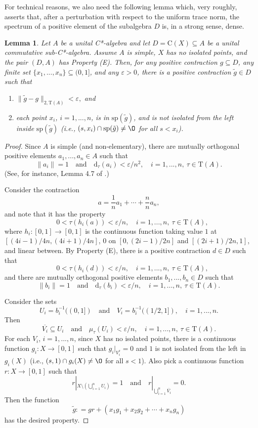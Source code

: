 \documentclass[12pt, oneside, psamsfonts]{amsart}
\newtheorem{lem}[thm]{Lemma}
\theoremstyle{definition}
\theoremstyle{remark}
\numberwithin{equation}{section}
\newcommand{\norm}[1]{\| #1\|}
\newcommand{\eps}{\varepsilon}
\newcommand{\tr}{\mathrm{T}}
\begin{document}
For technical reasons, we also need the following lemma which, very roughly, asserts that, after a perturbation with respect to the uniform trace norm, the spectrum of a positive element of the subalgebra $D$ is, in a strong sense, dense.
\begin{lem}\label{dense-sp-pert}
Let $A$ be a unital C*-algebra and let $D = \mathrm{C}(X) \subseteq A$ be a unital commutative sub-C*-algebra. Assume $A$ is simple, $X$ has no isolated points, and the pair $(D, A)$ has Property (E). Then, for any positive contraction $g \subseteq D$, any finite set $\{x_1, ..., x_n\} \subseteq (0, 1]$, and any $\eps>0$, there is a positive contraction $\tilde{g} \in D$ such that 
\begin{enumerate}
\item $\norm{\tilde{g} - g}_{2, \tr(A)} < \eps,$ and 
\item each point $x_i$, $i=1, ..., n$, is in $\mathrm{sp}(\tilde{g})$, and is not isolated from the left inside $\mathrm{sp}(\tilde{g})$ (i.e., $(s, x_i) \cap \mathrm{sp}(\tilde{g}) \neq \O$ for all $s < x_i$).
\end{enumerate}
\end{lem}
\begin{proof}
Since $A$ is simple (and non-elementary), there are mutually orthogonal positive elements $a_1, ..., a_n \in A$ such that $$\norm{a_i} = 1\quad  \mathrm{and} \quad \mathrm{d}_\tau(a_i) < \eps/n^2,\quad i=1, ..., n,\ \tau \in\tr(A). $$ (See, for instance, Lemma 4.7 of \cite{Niu-MD-Z}.)

Consider the contraction $$a= \frac{1}{n} a_1 + \cdots + \frac{n}{n} a_n,$$ and note that it has the property 
$$\quad 0 < \tau(h_i(a)) < \eps/n,\quad i=1, ..., n,\ \tau \in\tr(A),$$ where 
$h_i: [0, 1] \to [0, 1]$ is the continuous function taking value $1$ at $[(4i-1)/4n, (4i+1)/4n]$, $0$ on $[0, (2i-1)/2n]$ and $[(2i+1)/2n, 1]$, and linear between. By Property (E), there is a positive contraction $d \in D$ such that
$$\quad 0 < \tau(h_i(d)) < \eps/n,\quad i=1, ..., n,\ \tau \in\tr(A),$$
and there are mutually orthogonal positive elements $b_1, ..., b_n \in D$ such that
$$ \norm{b_i} = 1 \quad \mathrm{and} \quad \mathrm{d}_\tau(b_i)<\eps/n,\quad i=1, ..., n,\ \tau \in\tr(A). $$

Consider the sets  $$U_i = b^{-1}_i((0, 1]) \quad \mathrm{and} \quad V_i = b_i^{-1}((1/2, 1]),\quad i=1, ..., n. $$ Then
$$\overline{V_i} \subseteq U_i \quad\mathrm{and} \quad \mu_\tau(U_i) < \eps/n,\quad i=1, ..., n,\ \tau \in\tr(A).$$
For each $V_i$, $i=1, ..., n$, since $X$ has no isolated points, there is a continuous function $g_i: X \to [0, 1]$ such that $ g_i|_{V_i^c} = 0$ and $1$ is not isolated from the left in $g_i(X)$ (i.e., $(s, 1) \cap g_i(X) \neq \O$ for all $s<1$). Also pick a continuous function $r: X \to [0, 1]$ such that $$r|_{X \setminus (\bigcup_{i=1}^n U_i)} = 1\quad \mathrm{and}\quad r|_{\bigcup_{i=1}^n \overline{V_i}} = 0.$$
Then the function 
$$ \tilde{g}: = g r + (x_1g_1 + x_2g_2 + \cdots + x_ng_n)$$
has the desired property.
\end{proof}
\end{document}
